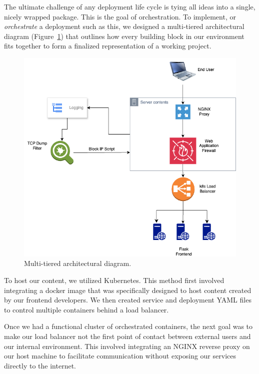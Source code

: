 The ultimate challenge of any deployment life cycle is tying all ideas into a single, nicely wrapped package. This is the goal of orchestration.
To implement, or \textit{orchestrate} a deployment such as this, we designed a multi-tiered architectural diagram (Figure~\ref{fig:architecture})
that outlines how every building block in our environment fits together to form a finalized representation of a working project. 

\begin{figure}[h]
    \centering
    \includegraphics[width=\columnwidth]{resources/diagram.png} 
    \caption{Multi-tiered architectural diagram.}
    \label{fig:architecture}
\end{figure}

To host our content, we utilized Kubernetes. This method first involved integrating a docker image that was specifically designed to host content created by our frontend developers.
We then created service and deployment YAML files to control multiple containers behind a load balancer. 

Once we had a functional cluster of orchestrated containers, the next goal was to make our load balancer not the first point of contact between external users and our internal environment. 
This involved integrating an NGINX reverse proxy on our host machine to facilitate communication without exposing our services directly to the internet. 

